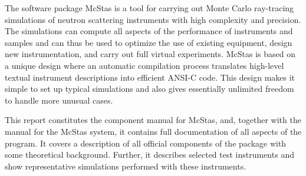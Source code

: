 The software package McStas is a tool for carrying out Monte Carlo
ray-tracing simulations of neutron scattering instruments with high
complexity and precision. The simulations can compute all aspects of the
performance of instruments and samples 
and can thus be used to optimize the use of existing equipment, 
design new instrumentation, and carry out full virtual experiments. 
McStas is based on a unique design where an automatic compilation process
translates high-level textual instrument descriptions into efficient
ANSI-C code. This design makes it simple to set up typical simulations
and also gives essentially unlimited freedom to handle more unusual
cases.

This report constitutes the component manual for McStas, and,
together with the manual for the McStas system, it
contains full documentation of all aspects of the program. It covers
a description of all official components of the \MCS package with
some theoretical background. Further, it describes selected test
instruments and show representative \MCS simulations performed with these
instruments.
